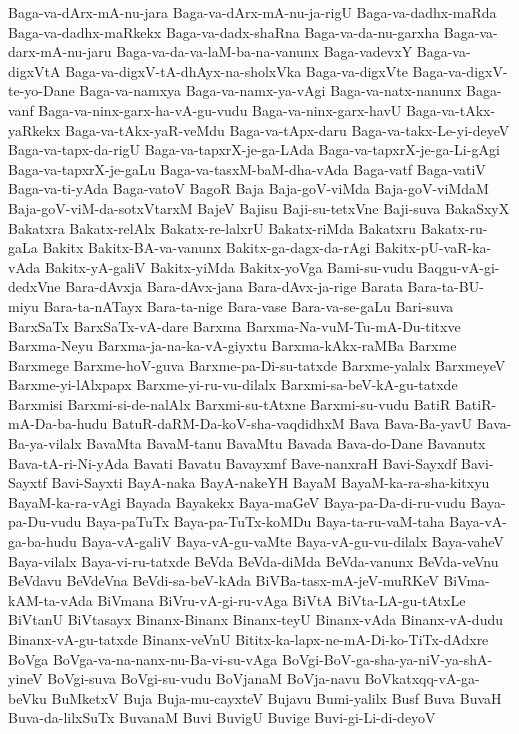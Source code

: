{Baga-va-dArx-mA-nu-jara
Baga-va-dArx-mA-nu-ja-rigU
Baga-va-dadhx-maRda
Baga-va-dadhx-maRkekx
Baga-va-dadx-shaRna
Baga-va-da-nu-garxha
Baga-va-darx-mA-nu-jaru
Baga-va-da-va-laM-ba-na-vanunx
Baga-vadevxY
Baga-va-digxVtA
Baga-va-digxV-tA-dhAyx-na-sholxVka
Baga-va-digxVte
Baga-va-digxV-te-yo-Dane
Baga-va-namxya
Baga-va-namx-ya-vAgi
Baga-va-natx-nanunx
Baga-vanf
Baga-va-ninx-garx-ha-vA-gu-vudu
Baga-va-ninx-garx-havU
Baga-va-tAkx-yaRkekx
Baga-va-tAkx-yaR-veMdu
Baga-va-tApx-daru
Baga-va-takx-Le-yi-deyeV
Baga-va-tapx-da-rigU
Baga-va-tapxrX-je-ga-LAda
Baga-va-tapxrX-je-ga-Li-gAgi
Baga-va-tapxrX-je-gaLu
Baga-va-tasxM-baM-dha-vAda
Baga-vatf
Baga-vatiV
Baga-va-ti-yAda
Baga-vatoV
BagoR
Baja
Baja-goV-viMda
Baja-goV-viMdaM
Baja-goV-viM-da-sotxVtarxM
BajeV
Bajisu
Baji-su-tetxVne
Baji-suva
BakaSxyX
Bakatxra
Bakatx-relAlx
Bakatx-re-lalxrU
Bakatx-riMda
Bakatxru
Bakatx-ru-gaLa
Bakitx
Bakitx-BA-va-vanunx
Bakitx-ga-dagx-da-rAgi
Bakitx-pU-vaR-ka-vAda
Bakitx-yA-galiV
Bakitx-yiMda
Bakitx-yoVga
Bami-su-vudu
Baqgu-vA-gi-dedxVne
Bara-dAvxja
Bara-dAvx-jana
Bara-dAvx-ja-rige
Barata
Bara-ta-BU-miyu
Bara-ta-nATayx
Bara-ta-nige
Bara-vase
Bara-va-se-gaLu
Bari-suva
BarxSaTx
BarxSaTx-vA-dare
Barxma
Barxma-Na-vuM-Tu-mA-Du-titxve
Barxma-Neyu
Barxma-ja-na-ka-vA-giyxtu
Barxma-kAkx-raMBa
Barxme
Barxmege
Barxme-hoV-guva
Barxme-pa-Di-su-tatxde
Barxme-yalalx
BarxmeyeV
Barxme-yi-lAlxpapx
Barxme-yi-ru-vu-dilalx
Barxmi-sa-beV-kA-gu-tatxde
Barxmisi
Barxmi-si-de-nalAlx
Barxmi-su-tAtxne
Barxmi-su-vudu
BatiR
BatiR-mA-Da-ba-hudu
BatuR-daRM-Da-koV-sha-vaqdidhxM
Bava
Bava-Ba-yavU
Bava-Ba-ya-vilalx
BavaMta
BavaM-tanu
BavaMtu
Bavada
Bava-do-Dane
Bavanutx
Bava-tA-ri-Ni-yAda
Bavati
Bavatu
Bavayxmf
Bave-nanxraH
Bavi-Sayxdf
Bavi-Sayxtf
Bavi-Sayxti
BayA-naka
BayA-nakeYH
BayaM
BayaM-ka-ra-sha-kitxyu
BayaM-ka-ra-vAgi
Bayada
Bayakekx
Baya-maGeV
Baya-pa-Da-di-ru-vudu
Baya-pa-Du-vudu
Baya-paTuTx
Baya-pa-TuTx-koMDu
Baya-ta-ru-vaM-taha
Baya-vA-ga-ba-hudu
Baya-vA-galiV
Baya-vA-gu-vaMte
Baya-vA-gu-vu-dilalx
Baya-vaheV
Baya-vilalx
Baya-vi-ru-tatxde
BeVda
BeVda-diMda
BeVda-vanunx
BeVda-veVnu
BeVdavu
BeVdeVna
BeVdi-sa-beV-kAda
BiVBa-tasx-mA-jeV-muRKeV
BiVma-kAM-ta-vAda
BiVmana
BiVru-vA-gi-ru-vAga
BiVtA
BiVta-LA-gu-tAtxLe
BiVtanU
BiVtasayx
Binanx-Binanx
Binanx-teyU
Binanx-vAda
Binanx-vA-dudu
Binanx-vA-gu-tatxde
Binanx-veVnU
Bititx-ka-lapx-ne-mA-Di-ko-TiTx-dAdxre
BoVga
BoVga-va-na-nanx-nu-Ba-vi-su-vAga
BoVgi-BoV-ga-sha-ya-niV-ya-shA-yineV
BoVgi-suva
BoVgi-su-vudu
BoVjanaM
BoVja-navu
BoVkatxqq-vA-ga-beVku
BuMketxV
Buja
Buja-mu-cayxteV
Bujavu
Bumi-yalilx
Busf
Buva
BuvaH
Buva-da-lilxSuTx
BuvanaM
Buvi
BuvigU
Buvige
Buvi-gi-Li-di-deyoV
}
